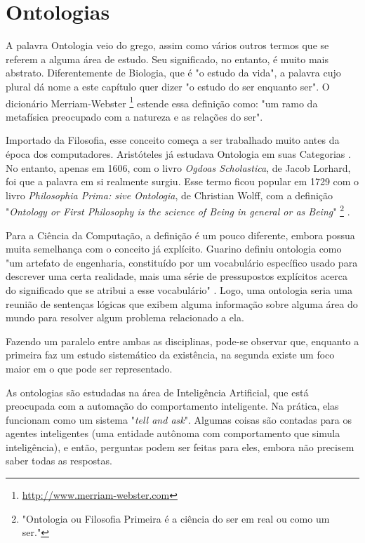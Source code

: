 \chapter{Ontologias}
\label{chap:ontologias}

\lettrine{A}{} palavra Ontologia veio do grego, assim como vários outros termos que se referem a alguma área de estudo. Seu significado, no entanto, é muito mais abstrato. Diferentemente de Biologia, que é "o estudo da vida", a palavra cujo plural dá nome a este capítulo quer dizer "o estudo do ser enquanto ser". O dicionário Merriam-Webster \footnote{\url{http://www.merriam-webster.com}} estende essa definição como: "um ramo da metafísica preocupado com a natureza e as relações do ser".

Importado da Filosofia, esse conceito começa a ser trabalhado muito antes da época dos computadores. Aristóteles já estudava Ontologia em suas Categorias \citep{ontoDahlberg}. No entanto, apenas em 1606, com o livro \textit{Ogdoas Scholastica}, de Jacob Lorhard, foi que a palavra em si realmente surgiu. Esse termo ficou popular em 1729 com o livro \textit{Philosophia Prima: sive Ontologia}, de Christian Wolff, com a definição "\textit{Ontology or First Philosophy is the science of Being in general or as Being}" \footnote{"Ontologia ou Filosofia Primeira é a ciência do ser em real ou como um ser."}  \citep{ontoNickles}.

Para a Ciência da Computação, a definição é um pouco diferente, embora possua muita semelhança com o conceito já explícito. Guarino definiu ontologia como "um artefato de engenharia, constituído por um vocabulário específico usado para descrever uma certa realidade, mais uma série de pressupostos explícitos acerca do significado que se atribui a esse vocabulário" \citep{ontoGuarino}. Logo, uma ontologia seria uma reunião de sentenças lógicas que exibem alguma informação sobre alguma área do mundo para resolver algum problema relacionado a ela.

Fazendo um paralelo entre ambas as disciplinas, pode-se observar que, enquanto a primeira faz um estudo sistemático da existência, na segunda existe um foco maior em o que pode ser representado.

As ontologias são estudadas na área de Inteligência Artificial, que está preocupada com a automação do comportamento inteligente. Na prática, elas funcionam como um sistema "\textit{tell and ask}". Algumas coisas são contadas para os agentes inteligentes (uma entidade autônoma com comportamento que simula inteligência), e então, perguntas podem ser feitas para eles, embora não precisem saber todas as respostas. 

